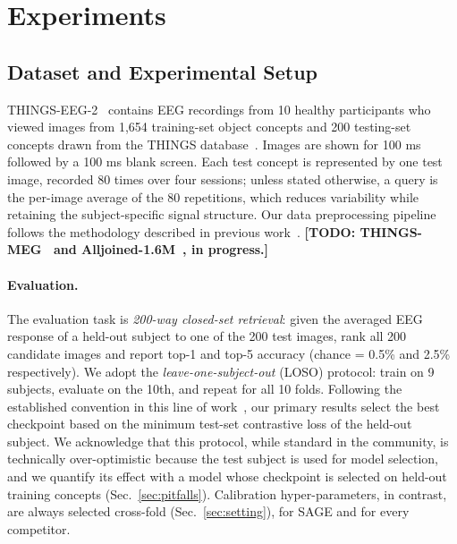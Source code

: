 \documentclass[10pt,twocolumn,letterpaper]{article}
\newcommand{\TODO}[1]{\textbf{\color{red}[TODO: #1]}}
\begin{document}
\section{Experiments}
\label{sec:exp}

\subsection{Dataset and Experimental Setup}
\label{sec:dataset}

THINGS-EEG-2~\cite{gifford2022things} contains EEG recordings from 10 healthy participants who viewed images from 1,654 training-set object concepts and 200 testing-set concepts drawn from the THINGS database~\cite{hebart2019things}. Images are shown for 100 ms followed by a 100 ms blank screen. Each test concept is represented by one test image, recorded 80 times over four sessions; unless stated otherwise, a query is the per-image average of the 80 repetitions, which reduces variability while retaining the subject-specific signal structure. Our data preprocessing pipeline follows the methodology described in previous work~\cite{song2024nice,li2024atm,wu2025ubp}. \TODO{THINGS-MEG~\cite{hebart2025thingsmeg} and Alljoined-1.6M~\cite{xu2025alljoined}, in progress.}

\paragraph{Evaluation.}
The evaluation task is \emph{200-way closed-set retrieval}: given the averaged EEG response of a held-out subject to one of the 200 test images, rank all 200 candidate images and report top-1 and top-5 accuracy (chance = 0.5\% and 2.5\% respectively). We adopt the \emph{leave-one-subject-out} (LOSO) protocol: train on 9 subjects, evaluate on the 10th, and repeat for all 10 folds. Following the established convention in this line of work~\cite{zhang2025neurobridge,du2025shallow,huang2026sattc,cui2026score,yadav2026svtl}, our primary results select the best checkpoint based on the minimum test-set contrastive loss of the held-out subject. We acknowledge that this protocol, while standard in the community, is technically over-optimistic because the test subject is used for model selection, and we quantify its effect with a model whose checkpoint is selected on held-out training concepts (Sec.~\ref{sec:pitfalls}). Calibration hyper-parameters, in contrast, are always selected cross-fold (Sec.~\ref{sec:setting}), for SAGE and for every competitor.
\end{document}
